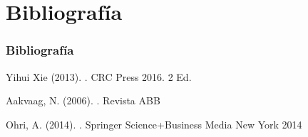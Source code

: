 \documentclass[11pt]{beamer}					%
\begin{document}
 \section{Bibliografía}
 	\begin{frame} 
 		\frametitle{Bibliografía}
	
\begin{thebibliography}{}

Yihui Xie (2013).
.
\newblock CRC Press 2016. 2 Ed.

Aakvaag, N. (2006).
.
\newblock Revista ABB

Ohri, A. (2014).
.
\newblock Springer Science+Business Media New York 2014

\end{thebibliography}

\end{frame}		
				
\end{document}
